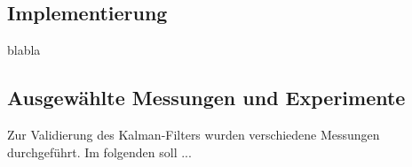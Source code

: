 \documentclass[times, 10pt,twocolumn]{article}
\begin{document}
	\subsection{Implementierung}
	blabla 
	\subsection{Ausgewählte Messungen und Experimente}
	Zur Validierung des Kalman-Filters wurden verschiedene Messungen durchgeführt. Im folgenden soll ...
	


\nocite{ex1, ex2}
\end{document}
